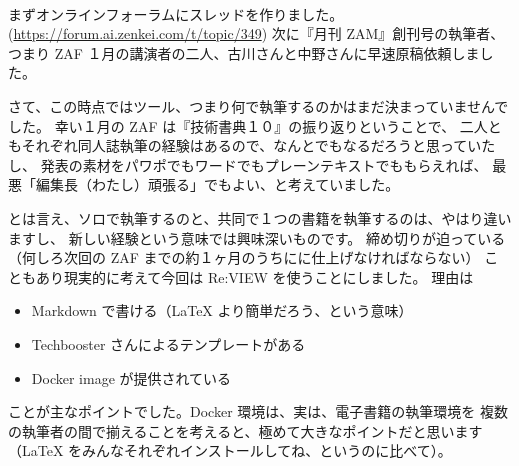 \documentclass[dvipdfmx,autodetect-engine,10pt,b5paper,papersize,openany,dvipsnames]{jsbook}
\begin{document}
\begin{multicols}{2}
\vspace{7.2cm}


まずオンラインフォーラムにスレッドを作りました。
(\url{https://forum.ai.zenkei.com/t/topic/349})
次に『月刊 ZAM』創刊号の執筆者、つまり
ZAF １月の講演者の二人、古川さんと中野さんに早速原稿依頼しました。


\vspace{5.2cm}

さて、この時点ではツール、つまり何で執筆するのかはまだ決まっていませんでした。
幸い１月の ZAF は『技術書典１０』の振り返りということで、
二人ともそれぞれ同人誌執筆の経験はあるので、なんとでもなるだろうと思っていたし、
発表の素材をパワポでもワードでもプレーンテキストでももらえれば、
最悪「編集長（わたし）頑張る」でもよい、と考えていました。

とは言え、ソロで執筆するのと、共同で１つの書籍を執筆するのは、やはり違いますし、
新しい経験という意味では興味深いものです。
締め切りが迫っている（何しろ次回の ZAF までの約１ヶ月のうちにに仕上げなければならない）
こともあり現実的に考えて今回は Re:VIEW を使うことにしました。
理由は
\begin{itemize}
\item Markdown で書ける（\LaTeX{} より簡単だろう、という意味）
\item Techbooster さんによるテンプレートがある
\item Docker image が提供されている
\end{itemize}
ことが主なポイントでした。Docker 環境は、実は、電子書籍の執筆環境を
複数の執筆者の間で揃えることを考えると、極めて大きなポイントだと思います
（\LaTeX{} をみんなそれぞれインストールしてね、というのに比べて）。



\end{multicols}
\end{document}
